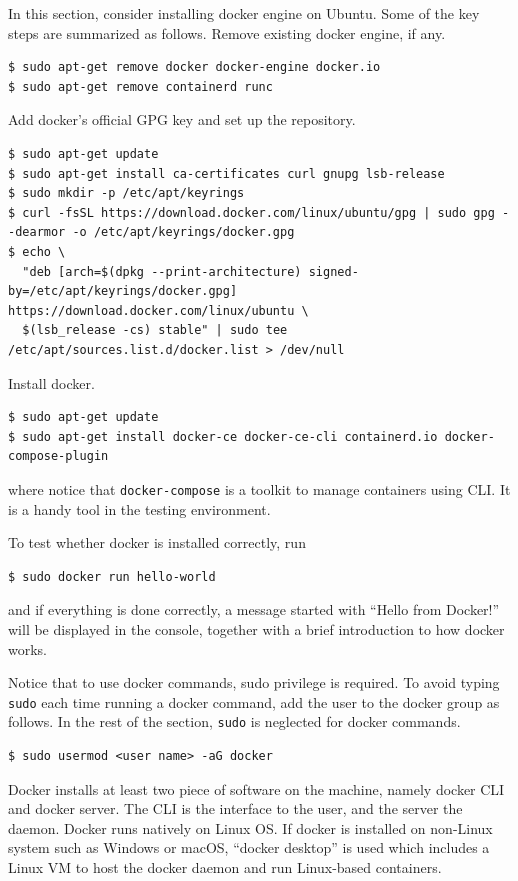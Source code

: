 In this section, consider installing docker engine on Ubuntu. Some of the key steps are summarized as follows. Remove existing docker engine, if any.
\begin{lstlisting}
$ sudo apt-get remove docker docker-engine docker.io
$ sudo apt-get remove containerd runc
\end{lstlisting}
Add docker's official GPG key and set up the repository.
\begin{lstlisting}
$ sudo apt-get update
$ sudo apt-get install ca-certificates curl gnupg lsb-release
$ sudo mkdir -p /etc/apt/keyrings
$ curl -fsSL https://download.docker.com/linux/ubuntu/gpg | sudo gpg --dearmor -o /etc/apt/keyrings/docker.gpg
$ echo \
  "deb [arch=$(dpkg --print-architecture) signed-by=/etc/apt/keyrings/docker.gpg] https://download.docker.com/linux/ubuntu \
  $(lsb_release -cs) stable" | sudo tee /etc/apt/sources.list.d/docker.list > /dev/null
\end{lstlisting}
Install docker.
\begin{lstlisting}
$ sudo apt-get update
$ sudo apt-get install docker-ce docker-ce-cli containerd.io docker-compose-plugin
\end{lstlisting}
where notice that \verb|docker-compose| is a toolkit to manage containers using CLI. It is a handy tool in the testing environment.

To test whether docker is installed correctly, run
\begin{lstlisting}
$ sudo docker run hello-world
\end{lstlisting}
and if everything is done correctly, a message started with ``Hello from Docker!'' will be displayed in the console, together with a brief introduction to how docker works.

Notice that to use docker commands, sudo privilege is required. To avoid typing \verb|sudo| each time running a docker command, add the user to the docker group as follows. In the rest of the section, \verb|sudo| is neglected for docker commands.
\begin{lstlisting}
$ sudo usermod <user name> -aG docker
\end{lstlisting}

Docker installs at least two piece of software on the machine, namely docker CLI and docker server. The CLI is the interface to the user, and the server the daemon. Docker runs natively on Linux OS. If docker is installed on non-Linux system such as Windows or macOS, ``docker desktop'' is used which includes a Linux VM to host the docker daemon and run Linux-based containers.

